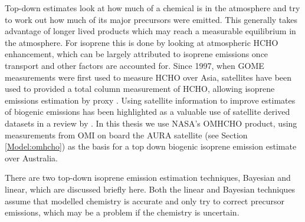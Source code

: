     Top-down estimates look at how much of a chemical is in the atmosphere and try to work out how much of its major precursors were emitted.
    This generally takes advantage of longer lived products which may reach a measurable equilibrium in the atmosphere.
    For isoprene this is done by looking at atmospheric HCHO enhancement, which can be largely attributed to isoprene emissions once transport and other factors are accounted for.
    Since 1997, when GOME measurements were first used to measure HCHO over Asia,  satellites have been used to provided a total column measurement of HCHO, allowing isoprene emissions estimation by proxy \parencite{Thomas1998,Palmer2001,Bauwens2016}.
    Using satellite information to improve estimates of biogenic emissions has been highlighted as a valuable use of satellite derived datasets in a review by \textcite{Streets2013}.
    In this thesis we use NASA's OMHCHO product, using measurements from OMI on board the AURA satellite (see Section \ref{Model:omhcho}) as the basis for a top down biogenic isoprene emission estimate over Australia.
    
    There are two top-down isoprene emission estimation techniques, Bayesian and linear, which are discussed briefly here.
    Both the linear and Bayesian techniques assume that modelled chemistry is accurate and only try to correct precursor emissions, which may be a problem if the chemistry is uncertain.
    
    
    
